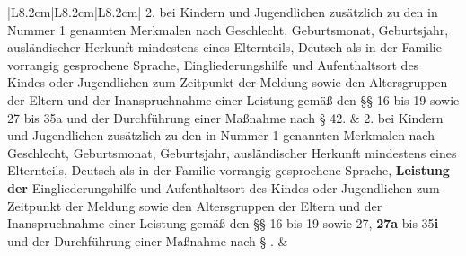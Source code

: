 \documentclass[10pt,a4paper,landscape]{article}
\begin{document}
\begin{longtable}{|L{8.2cm}|L{8.2cm}|L{8.2cm}|}
\hhline{|---|}
2.   \newline bei Kindern und Jugendlichen zusätzlich zu  \newline den in Nummer 1 genannten Merkmalen  \newline nach Geschlecht, Geburtsmonat,  \newline Geburtsjahr, ausländischer Herkunft  \newline mindestens eines Elternteils, Deutsch als in  \newline der Familie vorrangig gesprochene  \newline Sprache, Eingliederungshilfe und  \newline Aufenthaltsort des Kindes oder  \newline Jugendlichen zum Zeitpunkt der Meldung  \newline sowie den Altersgruppen der Eltern und der  \newline Inanspruchnahme einer Leistung gemäß  \newline den \S{}\S{} 16 bis 19 sowie 27 bis 35a und der  \newline Durchführung einer Maßnahme nach \S{} 42. & 2.   \newline bei Kindern und Jugendlichen zusätzlich zu  \newline den in Nummer 1 genannten Merkmalen  \newline nach Geschlecht, Geburtsmonat,  \newline Geburtsjahr, ausländischer Herkunft  \newline mindestens eines Elternteils, Deutsch als in  \newline der Familie vorrangig gesprochene  \newline Sprache, \textbf{\textcolor{diffred}{Leistung der}} Eingliederungshilfe  \newline und Aufenthaltsort des Kindes oder  \newline Jugendlichen zum Zeitpunkt der Meldung  \newline sowie den Altersgruppen der Eltern und der  \newline Inanspruchnahme einer Leistung gemäß  \newline den \S{}\S{} 16 bis 19 sowie 27, \textbf{\textcolor{diffred}{27a}} bis 35\textbf{\textcolor{diffred}{i}} und  \newline der Durchführung einer Maßnahme nach \S{}  . &  \\
\hhline{|---|}

\end{longtable}
\end{document}
